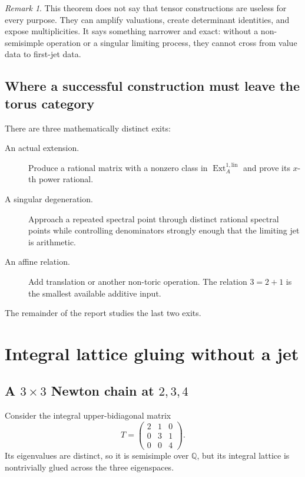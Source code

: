 \documentclass[11pt,oneside]{article}
\theoremstyle{definition}
\theoremstyle{remark}
\newtheorem{remark}[theorem]{Remark}
\newcommand{\Q}{\mathbb Q}
\newcommand{\Ext}{\operatorname{Ext}}
\begin{document}
\begin{remark}
This theorem does not say that tensor constructions are useless for every purpose.  They can
amplify valuations, create determinant identities, and expose multiplicities.  It says
something narrower and exact: without a non-semisimple operation or a singular limiting
process, they cannot cross from value data to first-jet data.
\end{remark}

\subsection{Where a successful construction must leave the torus category}

There are three mathematically distinct exits:

\begin{description}
\item[An actual extension.] Produce a rational matrix with a nonzero class in
$\Ext_A^{1,\mathrm{lin}}$ and prove its $x$-th power rational.

\item[A singular degeneration.] Approach a repeated spectral point through distinct rational
spectral points while controlling denominators strongly enough that the limiting jet is
arithmetic.

\item[An affine relation.] Add translation or another non-toric operation.  The relation
$3=2+1$ is the smallest available additive input.
\end{description}

The remainder of the report studies the last two exits.

\section{Integral lattice gluing without a jet}
\label{sec:newtonchain}

\subsection{A \texorpdfstring{$3\times3$}{3 x 3} Newton chain at \texorpdfstring{$2,3,4$}{2, 3, 4}}

Consider the integral upper-bidiagonal matrix
\begin{equation}
 T=
 \begin{pmatrix}
 2&1&0\\
 0&3&1\\
 0&0&4
 \end{pmatrix}.
 \label{eq:T234}
\end{equation}
Its eigenvalues are distinct, so it is semisimple over $\Q$, but its integral lattice is
nontrivially glued across the three eigenspaces.
\end{document}
